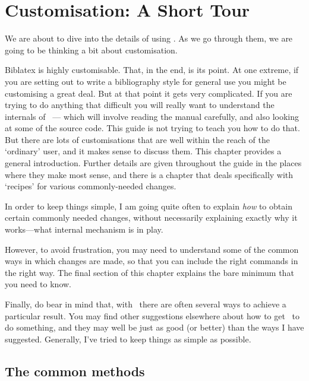 \chapter{Customisation: A Short Tour}\label{ch:customize1}

We are about to dive into the details of using \biblatex. As we go
through them, we are going to be thinking a bit about
customisation.

\textsf{Biblatex} is highly customisable. That, in the end, is its
point. At one extreme, if you are setting out to write a bibliography
style for general use you might be customising a great deal. But at
that point it gets very complicated. If you are trying to do anything
that difficult you will really want to understand the internals of
\biblatex\ --- which will involve reading the manual
carefully, and also looking at some of the
source code. This guide is not trying to teach you how to do that. But
there are lots of customisations that are well within the reach of the
`ordinary' user, and it makes sense to discuss them. This chapter
provides a general introduction. Further details are given throughout
the guide in the places where they make most sense, and there is a
chapter that deals specifically with
`recipes' for various commonly-needed changes.

In order to keep things simple, I am going quite often to explain
\emph{how} to obtain certain commonly needed changes, without
necessarily explaining exactly why it works---what internal mechanism
is in play.

However, to avoid frustration, you may need to understand some of the
common ways in which changes are made, so that you can include the
right commands in the right way. The final section of this chapter
explains the bare minimum that you need to know.

Finally, do bear in mind that, with \biblatex\ there are often several
ways to achieve a particular result. You may find other suggestions
elsewhere about how to get \biblatex\ to do something, and they may
well be just as good (or better) than the ways I have
suggested. Generally, I've tried to keep things as simple as possible.

\clearpage
\section{The common methods}

